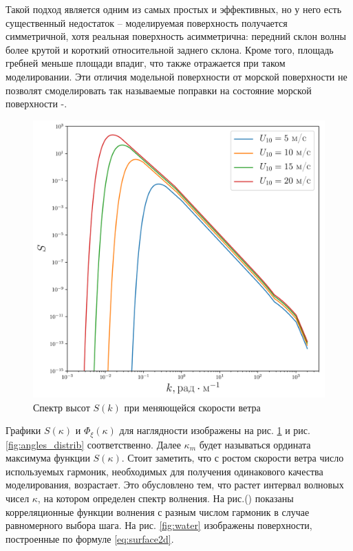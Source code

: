 Такой подход является одним из самых простых и эффективных, но у
него есть существенный недостаток – моделируемая поверхность получается симметричной, хотя реальная поверхность асимметрична: передний склон
волны более крутой и короткий относительной заднего склона.
Кроме того, площадь гребней меньше площади впадиг, что также отражается при
таком моделировании. Эти отличия модельной поверхности от морской поверхности
не позволят смоделировать так называемые поправки на состояние морской
поверхности \cite{cite:12}-\cite{cite:13}. 
\begin{figure}[ht]
        \centering
        \includegraphics[width=0.6\linewidth]{fig/full_spectrum1.png}
        \caption{Спектр высот $S(k)$ при меняющейся скорости ветра}
        \label{fig:spectrum_heights}
\end{figure}

Графики $S(\kappa)$ и  $\Phi_\xi(\kappa)$ для наглядности изображены на рис.
\ref{fig:spectrum_heights} и рис. \ref{fig:angles_distrib} соответственно.
Далее $\kappa_m$ будет называться ордината максимума функции  $S(\kappa)$. Стоит
заметить, что с ростом скорости ветра число используемых гармоник, необходимых
для получения одинакового качества моделирования,
возрастает. 
Это обусловлено тем, что растет интервал волновых чисел $\kappa$, на котором
определен спектр волнения. На рис.() показаны корреляционные функции волнения с
разным числом гармоник в случае равномерного выбора шага. 
На рис. \ref{fig:water} изображены поверхности,
построенные по формуле \eqref{eq:surface2d}.



